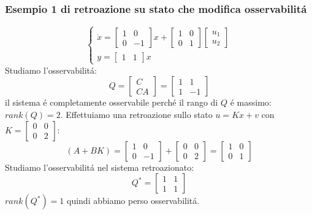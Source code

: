 \documentclass[../main.tex]{subfiles}
\begin{document}
	\subsubsection{Esempio 1 di retroazione su stato che modifica osservabilit\'a}
		\[
			\begin{cases}
				\dot x =
				\begin{bmatrix}
					1 & 0\\
					0 & -1
				\end{bmatrix} x +
				\begin{bmatrix}
					1 & 0\\
					0 & 1
				\end{bmatrix}
				\begin{bmatrix}
					u_1\\
					u_2
				\end{bmatrix}
				\\
				y =
				\begin{bmatrix}
					1 & 1
				\end{bmatrix} x
			\end{cases}
		\]
		Studiamo l'osservabilit\'a:
		\[
			Q =
			\begin{bmatrix}
				C\\
				CA
			\end{bmatrix} =
			\begin{bmatrix}
				1 & 1\\
				1 & -1
			\end{bmatrix}
		\]
		il sistema \'e completamente osservabile perch\'e il rango di $ Q $ \'e massimo: $ rank(Q) = 2 $. Effettuiamo una retroazione sullo stato $ u = Kx + v $ con $ K = \left[ \begin{smallmatrix} 0 & 0\\ 0 & 2 \end{smallmatrix} \right] $:
		\[
			(A+BK) =
			\begin{bmatrix}
				1 & 0\\
				0 & -1
			\end{bmatrix} +
			\begin{bmatrix}
				0 & 0\\
				0 & 2
			\end{bmatrix} =
			\begin{bmatrix}
				1 & 0\\
				0 & 1
			\end{bmatrix}
		\]
		Studiamo l'osservabilit\'a nel sistema retroazionato:
		\[
			Q^{*} =
			\begin{bmatrix}
				1 & 1\\
				1 & 1
			\end{bmatrix}
		\]
		$ rank(Q^{*}) = 1 $ quindi abbiamo perso osservabilit\'a.
		
\end{document}
